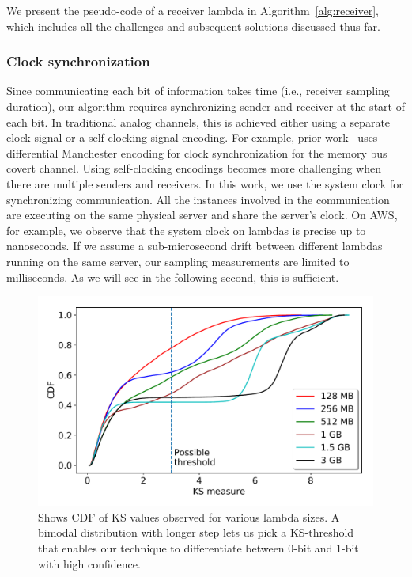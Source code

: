 We present the pseudo-code of a receiver lambda in Algorithm~\ref{alg:receiver},
which includes all the challenges and subsequent solutions discussed thus
far.

\subsubsection{Clock synchronization} 
Since communicating each bit of information takes time (i.e., receiver sampling
duration), our algorithm requires synchronizing sender and receiver at the start
of each bit. In traditional analog channels, this is achieved either using a
separate clock signal or a self-clocking signal encoding. For example, prior
work~\cite{whispers} uses differential Manchester encoding for clock
synchronization for the memory bus covert channel. Using self-clocking encodings
becomes more challenging when there are multiple senders and receivers. In this
work, we use the system clock for synchronizing communication.  All the
instances involved in the communication are executing on the same physical
server and share the server's clock. On AWS, for example, we observe that the
system clock on lambdas is precise up to nanoseconds. If we assume a
sub-microsecond drift between different lambdas running on the same server, our
sampling measurements are limited to milliseconds. As we will see in the
following second, this is sufficient.


\begin{figure}[!t]
  \includegraphics[width=.99\linewidth]{fig/ksvalues.pdf}
  \caption{Shows CDF of KS values observed for various lambda sizes. A bimodal distribution 
  with longer step lets us pick a KS-threshold that enables our technique to differentiate 
  between 0-bit and 1-bit with high confidence. 
\label{fig:ks_values}}
\end{figure}

